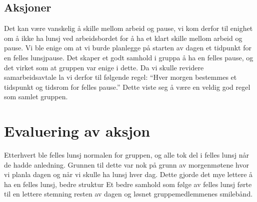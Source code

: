 \subsection*{Aksjoner}
Det kan være vanskelig å skille mellom arbeid og pause, vi kom derfor til enighet om å ikke ha lunsj ved arbeidsbordet for å ha et klart skille mellom arbeid og pause. 
Vi ble enige om at vi burde planlegge på starten av dagen et tidpunkt for en felles lunsjpause. Det skaper et godt samhold i gruppa å ha en felles pause, og det virket som at gruppen var enige i dette.  Da vi skulle revidere samarbeidsavtale la vi derfor til følgende regel:  ``Hver morgen bestemmes et tidspunkt og tidsrom for felles pause.'' Dette viste seg å være en veldig god regel som samlet gruppen.

\section{Evaluering av aksjon} 
Etterhvert ble felles lunsj normalen for gruppen, og alle tok del i felles lunsj når de hadde anledning. Grunnen til dette var nok på grunn av morgenmøtene hvor vi planla dagen og når vi skulle ha lunsj hver dag. Dette gjorde det mye lettere å ha en felles lunsj, bedre struktur Et bedre samhold som følge av felles lunsj førte til en lettere stemning resten av dagen og løsnet gruppemedlemmenes smilebånd.